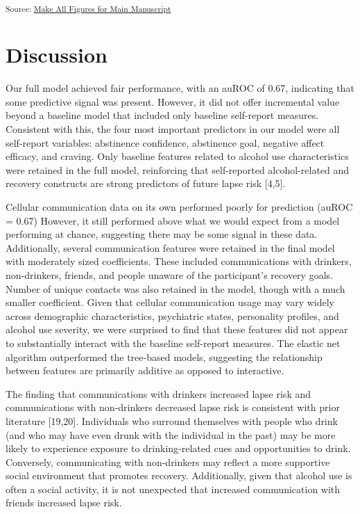 \documentclass[
  letterpaper,
  DIV=11,
  numbers=noendperiod]{scrartcl}
\begin{document}
\textsubscript{Source:
\href{https://jjcurtin.github.io/study_messages/notebooks/mak_figures-preview.html\#cell-fig-1}{Make
All Figures for Main Manuscript}}

\section{Discussion}\label{discussion}

Our full model achieved fair performance, with an auROC of 0.67,
indicating that some predictive signal was present. However, it did not
offer incremental value beyond a baseline model that included only
baseline self-report measures. Consistent with this, the four most
important predictors in our model were all self-report variables:
abstinence confidence, abstinence goal, negative affect efficacy, and
craving. Only baseline features related to alcohol use characteristics
were retained in the full model, reinforcing that self-reported
alcohol-related and recovery constructs are strong predictors of future
lapse risk {[}4,5{]}.

Cellular communication data on its own performed poorly for prediction
(auROC = 0.67) However, it still performed above what we would expect
from a model performing at chance, suggesting there may be some signal
in these data. Additionally, several communication features were
retained in the final model with moderately sized coefficients. These
included communications with drinkers, non-drinkers, friends, and people
unaware of the participant's recovery goals. Number of unique contacts
was also retained in the model, though with a much smaller coefficient.
Given that cellular communication usage may vary widely across
demographic characteristics, psychiatric states, personality profiles,
and alcohol use severity, we were surprised to find that these features
did not appear to substantially interact with the baseline self-report
measures. The elastic net algorithm outperformed the tree-based models,
suggesting the relationship between features are primarily additive as
opposed to interactive.

The finding that communications with drinkers increased lapse risk and
communications with non-drinkers decreased lapse risk is consistent with
prior literature {[}19,20{]}. Individuals who surround themselves with
people who drink (and who may have even drunk with the individual in the
past) may be more likely to experience exposure to drinking-related cues
and opportunities to drink. Conversely, communicating with non-drinkers
may reflect a more supportive social environment that promotes recovery.
Additionally, given that alcohol use is often a social activity, it is
not unexpected that increased communication with friends increased lapse
risk.
\end{document}
